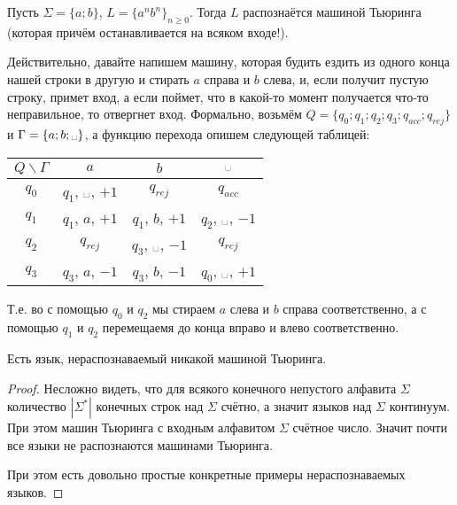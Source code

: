 \documentclass[12pt,a4paper]{article}
\newcommand{\spacesymbol}{\ensuremath{\text{\textvisiblespace}}}
\begin{document}
    \begin{example}
        Пусть $\Sigma = \{a; b\}$, $L = \{a^nb ^n\}_{n \geqslant 0}$. Тогда $L$ распознаётся машиной Тьюринга (которая причём останавливается на всяком входе!).

        Действительно, давайте напишем машину, которая будить ездить из одного конца нашей строки в другую и стирать $a$ справа и $b$ слева, и, если получит пустую строку, примет вход, а если поймет, что в какой-то момент получается что-то неправильное, то отвергнет вход. Формально, возьмём $Q = \{q_0; q_1; q_2; q_3; q_{acc}; q_{rej}\}$ и $\Gamma = \{a; b; \spacesymbol\}$, а функцию перехода опишем следующей таблицей:
        \begin{table}[H]
            \centering
            \begin{tabular}{c||c|c|c}
                $Q\backslash\Gamma$& $a$& $b$& $\spacesymbol$\\
                \hline
                \hline
                $q_0$& $q_1$, \spacesymbol, $+1$& $q_{rej}$& $q_{acc}$\\
                \hline
                $q_1$& $q_1$, $a$, $+1$& $q_1$, $b$, $+1$& $q_2$, \spacesymbol, $-1$\\
                \hline
                $q_2$& $q_{rej}$& $q_3$, \spacesymbol, $-1$& $q_{rej}$\\
                \hline
                $q_3$& $q_3$, $a$, $-1$& $q_3$, $b$, $-1$& $q_0$, \spacesymbol, $+1$\\
            \end{tabular}
        \end{table}
        Т.е. во с помощью $q_0$ и $q_2$ мы стираем $a$ слева и $b$ справа соответственно, а с помощью $q_1$ и $q_2$ перемещаемя до конца вправо и влево соответственно.
    \end{example}

    \begin{theorem}
        Есть язык, нераспознаваемый никакой машиной Тьюринга.
    \end{theorem}

    \begin{proof}
        Несложно видеть, что для всякого конечного непустого алфавита $\Sigma$ количество $|\Sigma^*|$ конечных строк над $\Sigma$ счётно, а значит языков над $\Sigma$ континуум. При этом машин Тьюринга с входным алфавитом $\Sigma$ счётное число. Значит почти все языки не распознаются машинами Тьюринга.

        При этом есть довольно простые конкретные примеры нераспознаваемых языков.
    \end{proof}
\end{document}
